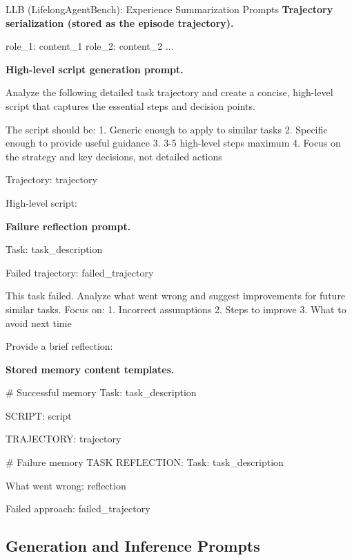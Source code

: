 \documentclass{article}
\theoremstyle{plain}
\theoremstyle{definition}
\theoremstyle{remark}
\begin{document}
\begin{PromptBox}{LLB (LifelongAgentBench): Experience Summarization Prompts}
\textbf{Trajectory serialization (stored as the episode trajectory).}
\begin{PromptCode}
{role_1}: {content_1}
{role_2}: {content_2}
...
\end{PromptCode}
\medskip
\textbf{High-level script generation prompt.}
\begin{PromptCode}
Analyze the following detailed task trajectory and create a concise,
high-level script that captures the essential steps and decision points.

The script should be:
1. Generic enough to apply to similar tasks
2. Specific enough to provide useful guidance
3. 3-5 high-level steps maximum
4. Focus on the strategy and key decisions, not detailed actions

Trajectory:
{trajectory}

High-level script:
\end{PromptCode}
\medskip
\textbf{Failure reflection prompt.}
\begin{PromptCode}
Task: {task_description}

Failed trajectory:
{failed_trajectory}

This task failed. Analyze what went wrong and suggest improvements for future similar tasks.
Focus on:
1. Incorrect assumptions
2. Steps to improve
3. What to avoid next time

Provide a brief reflection:
\end{PromptCode}
\medskip
\textbf{Stored memory content templates.}
\begin{PromptCode}
# Successful memory
Task: {task_description}

SCRIPT:
{script}

TRAJECTORY:
{trajectory}

# Failure memory
TASK REFLECTION:
Task: {task_description}

What went wrong:
{reflection}

Failed approach:
{failed_trajectory}
\end{PromptCode}
\end{PromptBox}
\medskip

\subsection{Generation and Inference Prompts}
\label{app:memrl-prompts:generation-inference}
\end{document}
